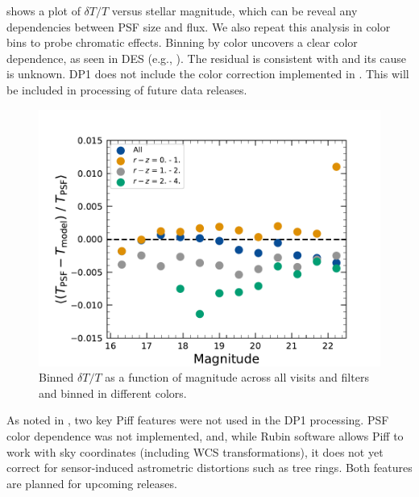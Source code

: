  shows a plot of  $\delta T/T$ versus stellar magnitude, which can be reveal any dependencies between \gls{PSF} size and flux.
We also repeat this analysis in color bins to probe chromatic effects.
Binning by color uncovers a clear color dependence, as seen in \gls{DES} (e.g., \citealt{DES:2020vau}).
The residual is consistent with  and its cause is unknown.
DP1 does not include the color correction implemented in \cite{2025OJAp....8E..26S}. 
This will be included in processing of future data releases.
\begin{figure}[htb!]
\centering
\includegraphics[width=0.98\linewidth]{dT_T_Piff_poly_4_vs_mag.pdf}
\caption{Binned $\delta T/T$ as a function of magnitude across
all visits and filters and binned in different colors.}
\label{fig:psf_residuals_mag_color}
\vspace{0.1cm}
\end{figure}

As noted in  \cite{PSTN-019}, two key Piff features were not used in the DP1 processing.
PSF color dependence was not implemented, and, while Rubin software allows Piff to work with sky coordinates (including WCS transformations), it does not yet correct for sensor-induced astrometric distortions such as tree rings.
Both features are planned for upcoming releases.

